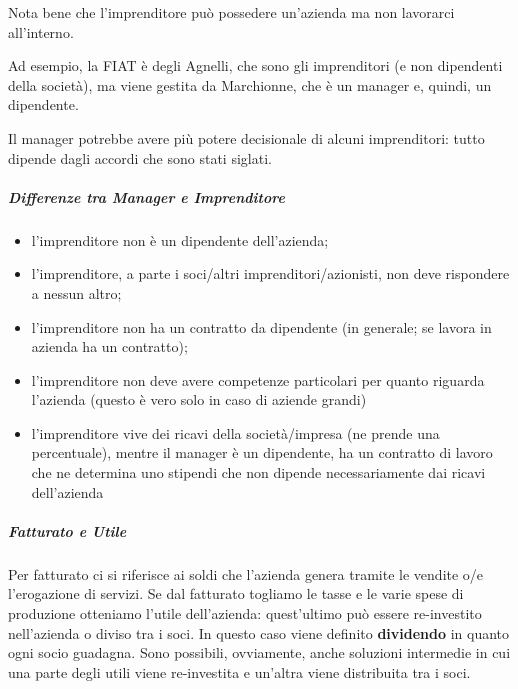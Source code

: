 \noindent Nota bene che l'imprenditore  può possedere un'azienda ma non
lavorarci all'interno.
\begin{example}[FIAT]
Ad esempio, la FIAT è degli Agnelli, che sono gli imprenditori (e non
dipendenti della società), ma viene gestita da Marchionne, che è un manager e,
quindi, un dipendente.
\end{example}

\noindent Il manager potrebbe avere più potere decisionale di alcuni
imprenditori: tutto dipende dagli accordi che sono stati siglati.

\subparagraph*{Differenze tra Manager e Imprenditore}
\begin{itemize}
  \item l'imprenditore non è un dipendente dell'azienda;
  \item l'imprenditore, a parte i soci/altri imprenditori/azionisti, non deve
rispondere a nessun altro;
  \item l'imprenditore non ha un contratto da dipendente (in generale; se
  lavora in azienda ha un contratto);
  \item l'imprenditore non deve avere competenze particolari per quanto riguarda
l'azienda (questo è vero solo in caso di aziende grandi)
  \item l'imprenditore vive dei ricavi della società/impresa (ne prende una
percentuale), mentre il manager è un dipendente, ha un contratto di lavoro che
ne determina uno stipendi che non dipende necessariamente dai ricavi
dell'azienda
\end{itemize}

\subparagraph*{Fatturato e Utile} Per fatturato ci si riferisce ai soldi che
l'azienda genera tramite le vendite o/e l'erogazione di servizi. Se dal
fatturato togliamo le tasse e le varie spese di produzione otteniamo l'utile
dell'azienda: quest'ultimo può essere re-investito nell'azienda o diviso tra
i soci. In questo caso viene definito \textbf{dividendo} in quanto ogni socio
guadagna. Sono possibili, ovviamente, anche soluzioni intermedie in cui una
parte degli utili viene re-investita e un'altra viene distribuita tra i soci.
